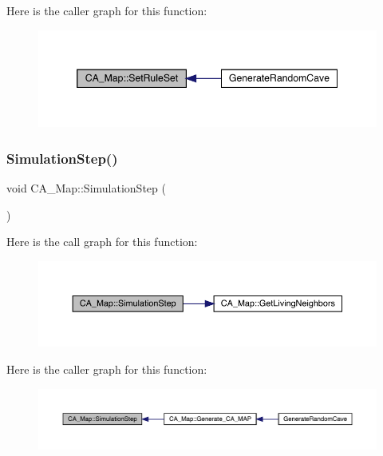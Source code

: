 Here is the caller graph for this function\+:
\nopagebreak
\begin{figure}[H]
\begin{center}
\leavevmode
\includegraphics[width=346pt]{df/dfe/class_c_a___map_a5d22c84ef623d63d99300d1f83af143e_icgraph}
\end{center}
\end{figure}
\mbox{\label{class_c_a___map_a9f978dd06a224ab2acf97f1c532ec3da}} 
\subsubsection{\texorpdfstring{Simulation\+Step()}{SimulationStep()}}
{\footnotesize\ttfamily void C\+A\+\_\+\+Map\+::\+Simulation\+Step (\begin{DoxyParamCaption}{ }\end{DoxyParamCaption})}

Here is the call graph for this function\+:
\nopagebreak
\begin{figure}[H]
\begin{center}
\leavevmode
\includegraphics[width=350pt]{df/dfe/class_c_a___map_a9f978dd06a224ab2acf97f1c532ec3da_cgraph}
\end{center}
\end{figure}
Here is the caller graph for this function\+:
\nopagebreak
\begin{figure}[H]
\begin{center}
\leavevmode
\includegraphics[width=350pt]{df/dfe/class_c_a___map_a9f978dd06a224ab2acf97f1c532ec3da_icgraph}
\end{center}
\end{figure}
\mbox{\label{class_c_a___map_a7a3a75540c418bdcee3689ecfca4cbff}} 
